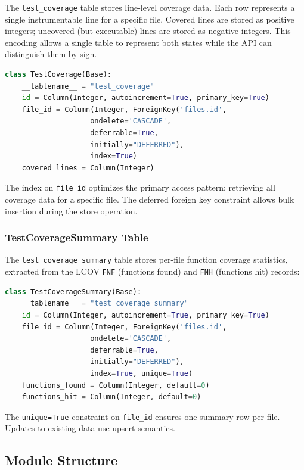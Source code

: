 The \texttt{test\_coverage} table stores line-level coverage data. Each row represents a single instrumentable line for a specific file. Covered lines are stored as positive integers; uncovered (but executable) lines are stored as negative integers. This encoding allows a single table to represent both states while the API can distinguish them by sign.

\begin{lstlisting}[language=Python, caption={TestCoverage database model}]
class TestCoverage(Base):
    __tablename__ = "test_coverage"
    id = Column(Integer, autoincrement=True, primary_key=True)
    file_id = Column(Integer, ForeignKey('files.id',
                    ondelete='CASCADE',
                    deferrable=True,
                    initially="DEFERRED"),
                    index=True)
    covered_lines = Column(Integer)
\end{lstlisting}

The index on \texttt{file\_id} optimizes the primary access pattern: retrieving all coverage data for a specific file. The deferred foreign key constraint allows bulk insertion during the store operation.

\subsubsection{TestCoverageSummary Table}

The \texttt{test\_coverage\_summary} table stores per-file function coverage statistics, extracted from the LCOV \texttt{FNF} (functions found) and \texttt{FNH} (functions hit) records:

\begin{lstlisting}[language=Python, caption={TestCoverageSummary database model}]
class TestCoverageSummary(Base):
    __tablename__ = "test_coverage_summary"
    id = Column(Integer, autoincrement=True, primary_key=True)
    file_id = Column(Integer, ForeignKey('files.id',
                    ondelete='CASCADE',
                    deferrable=True,
                    initially="DEFERRED"),
                    index=True, unique=True)
    functions_found = Column(Integer, default=0)
    functions_hit = Column(Integer, default=0)
\end{lstlisting}

The \texttt{unique=True} constraint on \texttt{file\_id} ensures one summary row per file. Updates to existing data use upsert semantics.

\subsection{Module Structure}

